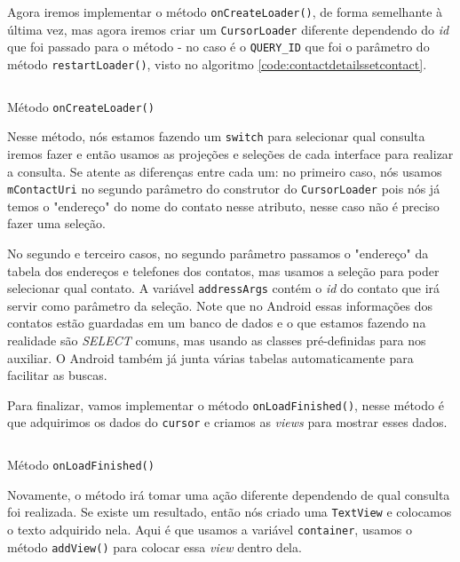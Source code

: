 \documentclass[a4paper,12pt,brazil]{book}
\begin{document}
\begin{singlespace}
	
	Agora iremos implementar o método \texttt{onCreateLoader()}, de forma semelhante à última vez, mas agora iremos criar um \texttt{CursorLoader} diferente dependendo do \emph{id} que foi passado para o método - no caso é o \texttt{QUERY\_ID} que foi o parâmetro do método \texttt{restartLoader()}, visto no algoritmo \ref{code:contactdetailssetcontact}.
		
		 \begin{listing}[H]
		\inputminted[linenos=true,fontsize=\small,frame=lines, framesep=2mm, tabsize=2,numbersep=5pt]{java}{src/api/contacts/oncreateloader2.java}
		\caption{Método \texttt{onCreateLoader()}}
		\label{code:contactdetailssoncreateloader}
		\end{listing} 			
	
	Nesse método, nós estamos fazendo um \texttt{switch} para selecionar qual consulta iremos fazer e então usamos as projeções e seleções de cada interface para realizar a consulta. Se atente as diferenças entre cada um: no primeiro caso, nós usamos \texttt{mContactUri} no segundo parâmetro do construtor do \texttt{CursorLoader} pois nós já temos o "endereço" do nome do contato nesse atributo, nesse caso não é preciso fazer uma seleção.

	 No segundo e terceiro casos, no segundo parâmetro passamos o "endereço" da tabela dos endereços e telefones dos contatos, mas usamos a seleção para poder selecionar qual contato. A variável \texttt{addressArgs} contém o \emph{id} do contato que irá servir como parâmetro da seleção. Note que no Android essas informações dos contatos estão guardadas em um banco de dados e o que estamos fazendo na realidade são \emph{SELECT} comuns, mas usando as classes pré-definidas para nos auxiliar. O Android também já junta várias tabelas automaticamente para facilitar as buscas.

	Para finalizar, vamos implementar o método \texttt{onLoadFinished()}, nesse método é que adquirimos os dados do \texttt{cursor} e criamos as \emph{views} para mostrar esses dados. 

		 \begin{listing}[H]
		\inputminted[linenos=true,fontsize=\small,frame=lines, framesep=2mm, tabsize=2,numbersep=5pt]{java}{src/api/contacts/onloadfinished2.java}
		\caption{Método \texttt{onLoadFinished()}}
		\label{code:contactsdetailsonloadfinished}
		\end{listing} 			

		Novamente, o método irá tomar uma ação diferente dependendo de qual consulta foi realizada. Se existe um resultado, então nós criado uma \texttt{TextView} e colocamos o texto adquirido nela. Aqui é que usamos a variável \texttt{container}, usamos o método \texttt{addView()} para colocar essa \emph{view} dentro dela.


\end{singlespace}
\end{document}
